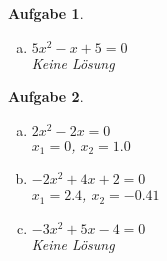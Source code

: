 \documentclass[12pt]{article}
\theoremstyle{note}
\newtheorem{aufgabe}{Aufgabe}
\begin{document}
\begin{flushleft}
\begin{aufgabe}
\begin{multicols}{3}
\begin{enumerate}[a)]
\item $5 x^{2} - x + 5 = 0$\\
{\tiny Keine Lösung}

\end{enumerate} 
\end{multicols} 
\end{aufgabe}\vspace{1em}\begin{aufgabe} ~ \ 
\begin{multicols}{3} 
\begin{enumerate}[a)] 
\item $2 x^{2} - 2 x = 0$\\
{\tiny $x_1=$$0$}{\tiny   ,     $x_2=$$1.0$}

\item $- 2 x^{2} + 4 x + 2 = 0$\\
{\tiny $x_1=$$2.4$}{\tiny   ,     $x_2=$$-0.41$}

\item $- 3 x^{2} + 5 x - 4 = 0$\\
{\tiny Keine Lösung}

\end{enumerate} 
\end{multicols} 
\end{aufgabe}\vspace{1em}
\end{flushleft} 
\end{document}
